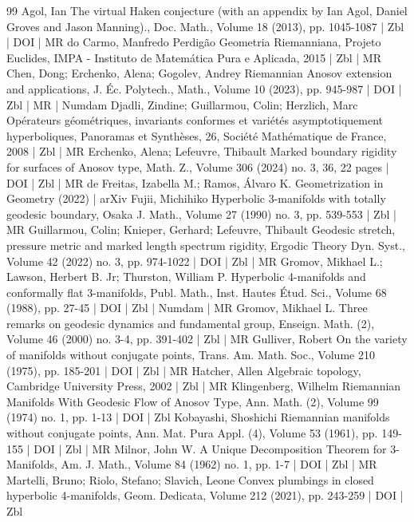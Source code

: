 \begin{thebibliography}{99}
Agol, Ian The virtual Haken conjecture (with an appendix by Ian Agol, Daniel Groves and Jason Manning)., Doc. Math., Volume 18 (2013), pp. 1045-1087 | Zbl | DOI | MR
do Carmo, Manfredo Perdigão Geometria Riemanniana, Projeto Euclides, IMPA - Instituto de Matemática Pura e Aplicada, 2015 | Zbl | MR
Chen, Dong; Erchenko, Alena; Gogolev, Andrey Riemannian Anosov extension and applications, J. Éc. Polytech., Math., Volume 10 (2023), pp. 945-987 | DOI | Zbl | MR | Numdam
Djadli, Zindine; Guillarmou, Colin; Herzlich, Marc Opérateurs géométriques, invariants conformes et variétés asymptotiquement hyperboliques, Panoramas et Synthèses, 26, Société Mathématique de France, 2008 | Zbl | MR
Erchenko, Alena; Lefeuvre, Thibault Marked boundary rigidity for surfaces of Anosov type, Math. Z., Volume 306 (2024) no. 3, 36, 22 pages | DOI | Zbl | MR
de Freitas, Izabella M.; Ramos, Álvaro K. Geometrization in Geometry (2022) | arXiv
Fujii, Michihiko Hyperbolic 3-manifolds with totally geodesic boundary, Osaka J. Math., Volume 27 (1990) no. 3, pp. 539-553 | Zbl | MR
Guillarmou, Colin; Knieper, Gerhard; Lefeuvre, Thibault Geodesic stretch, pressure metric and marked length spectrum rigidity, Ergodic Theory Dyn. Syst., Volume 42 (2022) no. 3, pp. 974-1022 | DOI | Zbl | MR
Gromov, Mikhael L.; Lawson, Herbert B. Jr; Thurston, William P. Hyperbolic 4-manifolds and conformally flat 3-manifolds, Publ. Math., Inst. Hautes Étud. Sci., Volume 68 (1988), pp. 27-45 | DOI | Zbl | Numdam | MR
Gromov, Mikhael L. Three remarks on geodesic dynamics and fundamental group, Enseign. Math. (2), Volume 46 (2000) no. 3-4, pp. 391-402 | Zbl | MR
Gulliver, Robert On the variety of manifolds without conjugate points, Trans. Am. Math. Soc., Volume 210 (1975), pp. 185-201 | DOI | Zbl | MR
Hatcher, Allen Algebraic topology, Cambridge University Press, 2002 | Zbl | MR
Klingenberg, Wilhelm Riemannian Manifolds With Geodesic Flow of Anosov Type, Ann. Math. (2), Volume 99 (1974) no. 1, pp. 1-13 | DOI | Zbl
Kobayashi, Shoshichi Riemannian manifolds without conjugate points, Ann. Mat. Pura Appl. (4), Volume 53 (1961), pp. 149-155 | DOI | Zbl | MR
Milnor, John W. A Unique Decomposition Theorem for 3-Manifolds, Am. J. Math., Volume 84 (1962) no. 1, pp. 1-7 | DOI | Zbl | MR
Martelli, Bruno; Riolo, Stefano; Slavich, Leone Convex plumbings in closed hyperbolic 4-manifolds, Geom. Dedicata, Volume 212 (2021), pp. 243-259 | DOI | Zbl
\end{thebibliography}
